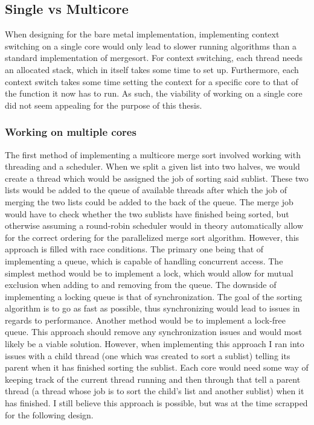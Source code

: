 \subsection{Single vs Multicore}
When designing for the bare metal implementation, implementing context switching
on a single core would only lead to slower running algorithms than a standard
implementation of mergesort. For context switching, each thread needs an
allocated stack, which in itself takes some time to set up. Furthermore, each
context switch takes some time setting the context for a specific core to that
of the function it now has to run. As such, the viability of working on a single
core did not seem appealing for the purpose of this thesis.

\subsubsection{Working on multiple cores}
The first method of implementing a multicore merge sort involved working with
threading and a scheduler. When we split a given list into two halves, we would
create a thread which would be assigned the job of sorting said sublist. These
two lists would be added to the queue of available threads after which the job
of merging the two lists could be added to the back of the queue. The merge job
would have to check whether the two sublists have finished being sorted, but
otherwise assuming a round-robin scheduler would in theory automatically allow
for the correct ordering for the parallelized merge sort algorithm. However,
this approach is filled with race conditions. The primary one being that of
implementing a queue, which is capable of handling concurrent access. The
simplest method would be to implement a lock, which would allow for mutual
exclusion when adding to and removing from the queue. The downside of
implementing a locking queue is that of synchronization. The goal of the sorting
algorithm is to go as fast as possible, thus synchronizing would lead to issues
in regards to performance. Another method would be to implement a lock-free
queue. This approach should remove any synchronization issues and would most
likely be a viable solution. However, when implementing this approach I ran into
issues with a child thread (one which was created to sort a sublist) telling its
parent when it has finished sorting the sublist. Each core would need some way
of keeping track of the current thread running and then through that tell a
parent thread (a thread whose job is to sort the child's list and another
sublist) when it has finished. I still believe this approach is possible, but
was at the time scrapped for the following design.

